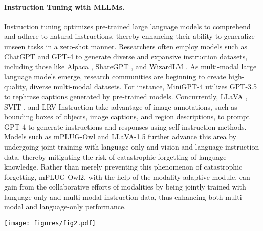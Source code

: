 \documentclass[10pt,twocolumn,letterpaper]{article}
\newcommand{\modelname}{mPLUG-Owl2\xspace}
\begin{document}
\paragraph{Instruction Tuning with MLLMs.}
Instruction tuning optimizes pre-trained large language models to comprehend and adhere to natural instructions, thereby enhancing their ability to generalize unseen tasks in a zero-shot manner. Researchers often employ models such as ChatGPT and GPT-4 \cite{OpenAI2023gpt4} to generate diverse and expansive instruction datasets, including those like Alpaca \cite{alpaca}, ShareGPT \cite{ShareGPT2023}, and WizardLM \cite{Xu2023WizardLM}. As multi-modal large language models emerge, research communities are beginning to create high-quality, diverse multi-modal datasets. For instance, MiniGPT-4 \cite{Zhu2023MiniGPT4} utilizes GPT-3.5 to rephrase captions generated by pre-trained models. Concurrently, LLaVA \cite{Liu2023Llava}, SVIT \cite{zhao2023svit}, and LRV-Instruction \cite{liu2023lrv} take advantage of image annotations, such as bounding boxes of objects, image captions, and region descriptions, to prompt GPT-4 to generate instructions and responses using self-instruction methods. Models such as mPLUG-Owl \cite{ye2023mplugowl} and LLaVA-1.5 \cite{Liu2023LLava15} further advance this area by undergoing joint training with language-only and vision-and-language instruction data, thereby mitigating the risk of catastrophic forgetting of language knowledge. Rather than merely preventing this phenomenon of catastrophic forgetting, \modelname, with the help of the modality-adaptive module, can gain from the collaborative efforts of modalities by being jointly trained with language-only and multi-modal instruction data, thus enhancing both multi-modal and language-only performance.


\begin{figure*}[!htbp]
    \centering
    \texttt{[image: figures/fig2.pdf]}
    \vspace{-1ex}
    \caption{Illustration of the proposed \modelname and its training paradigm. (a) An overview of \modelname, which consists of a vision encoder, visual abstractor, text embedding layer, and a language decoder. (b) Details of the proposed modality-adaptive module, which takes multi-modal inputs and employs different parameters to project various modalities into a shared semantic space for relational learning while preserving modality-specific features, thereby enabling modality collaboration. (c) The training paradigm of \modelname involves first pre-training the visual-related modules, including the vision encoder and visual abstractor. Simultaneously, newly added parameters in the language decoder are also learned during the pre-training stage. During the instruction tuning stage, both language instructions and multi-modal instructions are used to jointly train the entire model.}
    \vspace{-2ex}
    \label{fig:arch}
\end{figure*}
\end{document}
